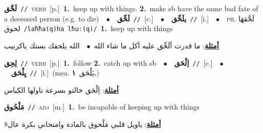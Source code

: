 \documentclass[10pt,a4paper,twoside]{article} %
\begin{document}
\begin{multicols}{2}
{\setlength\topsep{0pt}\textbf{\foreignlanguage{arabic}{لَحَّق}}\ {\color{gray}\texttt{//}\color{black}}\ \textsc{verb}\ [p.]\ \textbf{1.}~keep up with things.  \textbf{2.}~make sb have the same bad fate of a deceased person (e.g. to die)\ \ $\bullet$\ \ \setlength\topsep{0pt}\textbf{\foreignlanguage{arabic}{لَحِّق}}\ {\color{gray}\texttt{//}\color{black}}\ [c.]\ \ $\bullet$\ \ \setlength\topsep{0pt}\textbf{\foreignlanguage{arabic}{يلَحِّق}}\ {\color{gray}\texttt{//}\color{black}}\ [i.]\ \ $\bullet$\ \ \textsc{ph.} \color{gray} \foreignlanguage{arabic}{لَحَّقهَا لحوق}\color{black}\ {\color{gray}\texttt{/{\sffamily laħħa(q)ha lħuː(q)}/}\color{black}}\ \textbf{1.}~keep up with things\  \begin{flushright}\color{gray}\foreignlanguage{arabic}{\textbf{\underline{\foreignlanguage{arabic}{أمثلة}}}: ما قدرت ألَحِّق عليه أكل ما شاء الله\ $\bullet$\ \  الله يلحقك بستك ياكرنيب}\end{flushright}\color{black}} \vspace{2mm}

{\setlength\topsep{0pt}\textbf{\foreignlanguage{arabic}{لِحِق}}\ {\color{gray}\texttt{//}\color{black}}\ \textsc{verb}\ [p.]\ \textbf{1.}~follow  \textbf{2.}~catch up with sb\ \ $\bullet$\ \ \setlength\topsep{0pt}\textbf{\foreignlanguage{arabic}{اِلْحَق}}\ {\color{gray}\texttt{//}\color{black}}\ [c.]\ \ $\bullet$\ \ \setlength\topsep{0pt}\textbf{\foreignlanguage{arabic}{يِلْحَق}}\ {\color{gray}\texttt{//}\color{black}}\ [i.]\ \color{gray}(msa. \foreignlanguage{arabic}{يَلْحَق}~\foreignlanguage{arabic}{\textbf{١.}})\color{black}\  \begin{flushright}\color{gray}\foreignlanguage{arabic}{\textbf{\underline{\foreignlanguage{arabic}{أمثلة}}}: اِلْحَق خالتو بسرعة ناولها الكياس}\end{flushright}\color{black}} \vspace{2mm}

{\setlength\topsep{0pt}\textbf{\foreignlanguage{arabic}{مَلْحُوق}}\ {\color{gray}\texttt{//}\color{black}}\ \textsc{adj}\ [m.]\ \textbf{1.}~be incapable of keeping up with things\  \begin{flushright}\color{gray}\foreignlanguage{arabic}{\textbf{\underline{\foreignlanguage{arabic}{أمثلة}}}: ياويل قلبي مَلْحوق بالمادة وامتحاني بكرة عال8}\end{flushright}\color{black}} \vspace{2mm}


\end{multicols}
\end{document}
